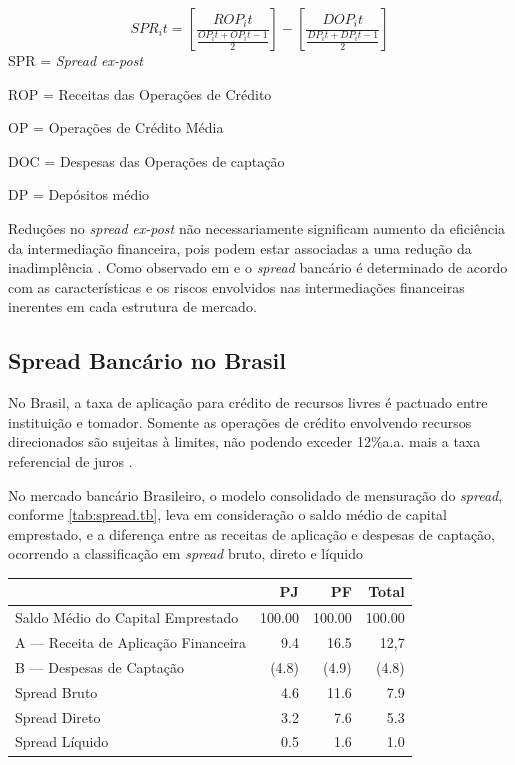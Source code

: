 \documentclass[12pt,12pt,openright,oneside,a4paper,chapter=TITLE,section=TITLE,subsection=TITLE,subsubsection=TITLE english,french,spanish,portugues,sumario=tradicional]{abntex2}
\begin{document}
\[
SPR_it = [\frac{ROP_it}{\frac{OP_it + OP_it-1}{2}}] - [\frac{DOP_it}{\frac{DP_it + DP_it-1}{2}}]
\]
SPR = \emph{Spread ex-post}

ROP = Receitas das Operações de Crédito

OP = Operações de Crédito Média

DOC = Despesas das Operações de captação

DP = Depósitos médio

Reduções no \emph{spread} \emph{ex-post} não necessariamente significam aumento da
eficiência da intermediação financeira, pois podem estar associadas a uma
redução da inadimplência \cite{kunt:1999}. Como observado em
\textcite{klein:1971} e \textcite{ho-saunders:1981} o \emph{spread} bancário é
determinado de acordo com as características e os riscos envolvidos nas
intermediações financeiras inerentes em cada estrutura de mercado.

\subsection{Spread Bancário no Brasil}

No Brasil, a taxa de aplicação para crédito de recursos livres é pactuado entre
instituição e tomador. Somente as operações de crédito envolvendo recursos
direcionados são sujeitas à limites, não podendo exceder 12\%a.a. mais a taxa
referencial de juros \cite{BCB:2016}.

No mercado bancário Brasileiro, o modelo consolidado de mensuração do \emph{spread},
conforme \autoref{tab:spread.tb}, leva em consideração o saldo médio de capital
emprestado, e a diferença entre as receitas de aplicação e despesas de
captação, ocorrendo a classificação em \emph{spread} bruto, direto e líquido
\cite{fipecafi:2005}

\begin{table}[b]
 \centering
    \label{tab:spread.tb}
     \begin{tabular}{l|r|r|r}
      \hline
                                           &   PJ   &   PF    & Total \\
       \hline
       Saldo Médio do Capital Emprestado   & 100.00 & 100.00  & 100.00 \\
       A — Receita de Aplicação Financeira & 9.4    & 16.5    & 12,7   \\
       B — Despesas de Captação            & (4.8)  & (4.9)   & (4.8)  \\   
       Spread Bruto                        & 4.6    & 11.6    & 7.9    \\
       Spread Direto                       & 3.2    & 7.6     & 5.3    \\
       Spread Líquido                      & 0.5    & 1.6     & 1.0    \\
       \hline
       \end{tabular}
\end{table}
\end{document}
